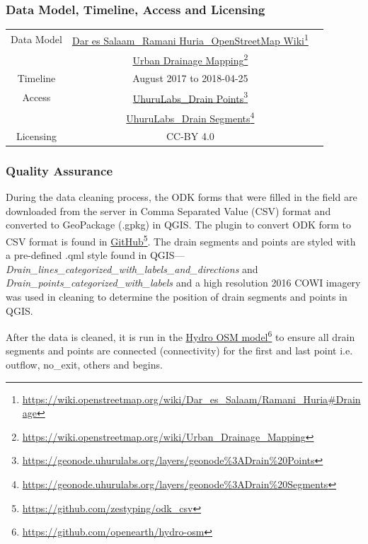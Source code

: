 \documentclass[a4paper,12pt,twoside]{article}
\begin{document}
\subsubsection{Data Model, Timeline, Access and Licensing}
\begin{center}
  \begin{tabular}{|c|c|c|}  
 \hline
    Data Model    &   \href{https://wiki.openstreetmap.org/wiki/Dar_es_Salaam/Ramani_Huria\#Drainage}{Dar es Salaam\_Ramani Huria\_OpenStreetMap Wiki}\footnote{\url{https://wiki.openstreetmap.org/wiki/Dar_es_Salaam/Ramani_Huria\#Drainage}}\\
    {} & \href{https://wiki.openstreetmap.org/wiki/Urban_Drainage_Mapping}{Urban Drainage Mapping}\footnote{\url{https://wiki.openstreetmap.org/wiki/Urban_Drainage_Mapping}}\\
\hline
   Timeline  & August 2017 to 2018-04-25 \\
\hline 
Access & {\href{https://geonode.uhurulabs.org/layers/geonode\%3ADrain\%20Points}{UhuruLabs\_Drain Points}\footnote{\url{https://geonode.uhurulabs.org/layers/geonode\%3ADrain\%20Points}}}\\
{} & {\href{https://geonode.uhurulabs.org/layers/geonode\%3ADrain\%20Segments}{UhuruLabs\_Drain Segments}\footnote{\url{https://geonode.uhurulabs.org/layers/geonode\%3ADrain\%20Segments}}} \\ 
 \hline      
  Licensing & CC-BY 4.0 \\
 \hline
\end{tabular}
\end{center}

\subsubsection{Quality Assurance}
During the data cleaning process, the ODK forms that were filled in the field are downloaded from the server in Comma Separated Value (CSV) format and converted to GeoPackage (.gpkg) in QGIS. The plugin to convert ODK form to CSV format is found in \href{https://github.com/zestyping/odk_csv}{GitHub}\footnote{\url{https://github.com/zestyping/odk\_csv}}. The drain segments and points are styled with a pre-defined .qml style found in QGIS---\textit{Drain\_lines\_categorized\_with\_labels\_and\_directions} and \textit{Drain\_points\_categorized\_with\_labels} and a high resolution 2016 COWI imagery was used in cleaning to determine the position of drain segments and points in QGIS.

After the data is cleaned, it is run in the \href{https://github.com/openearth/hydro-osm}{Hydro OSM model}\footnote{\url{https://github.com/openearth/hydro-osm}} to ensure all drain segments and points are connected  (connectivity) for the first and last point i.e. outflow, no\_exit, others and begins.
\end{document}
